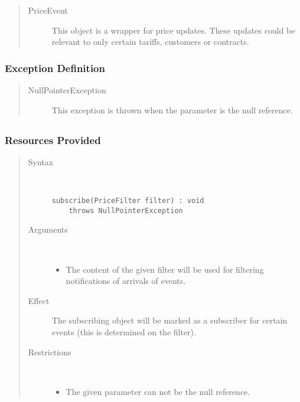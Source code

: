 \begin{quote}
	\begin{description}
		\item[PriceEvent] This object is a wrapper for price updates. These updates
		could be relevant to only certain tariffs, customers or contracts.
	\end{description} 
\end{quote}

\subsubsection{Exception Definition} 

\begin{quote}
	\begin{description}
		\item[NullPointerException] This exception is thrown when the parameter
		is the null reference.
	\end{description} 
\end{quote}

\subsection{}

\subsubsection{Resources Provided}

\begin{quote}
	\begin{description}
		\item[Syntax] \
		\begin{verbatim}
subscribe(PriceFilter filter) : void
    throws NullPointerException
		\end{verbatim}
		\item[Arguments] \
		\begin{itemize}
		  \item The content of the given filter will be used for filtering
		  notifications of arrivals of events.
		\end{itemize}
		\item[Effect] The subscribing object will be marked as a subscriber for
		certain events (this is determined on the filter).
		\item[Restrictions] \
		\begin{itemize}
		  \item The given parameter can not be the null reference.
		\end{itemize}
	\end{description} 
\end{quote}

